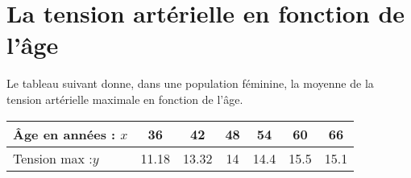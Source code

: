 \section{La tension artérielle en fonction de l'âge}

Le tableau suivant donne, dans une population féminine, la moyenne de la tension artérielle maximale en fonction de l'âge.

\begin{center}
	
\begin{tabular}{|@{\ }l@{\ }|@{\ }c@{\ }|@{\ }c@{\ }|@{\ }c@{\ }|@{\ }c@{\ }|@{\ }c@{\ }|@{\ }c@{\ }|}
	\hline
	\^Age en années : $x$ & 36            & 42           & 48 & 54           & 60           & 66           \\ \hline
	Tension max :$y$    & \num{11.18} & \num{13.32} & 14 & \num{14.4} & \num{15.5} & \num{15.1}	\\ \hline
\end{tabular}
	
\end{center}	
